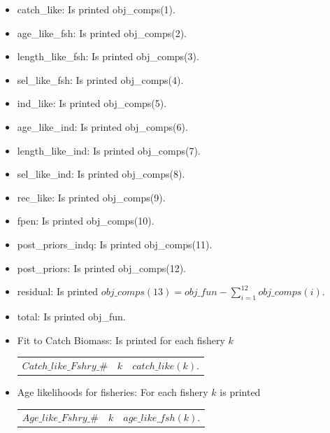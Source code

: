\documentclass{article}
\begin{document}
\begin{itemize}
    \item  catch\_like: Is printed obj\_comps(1).
    \item age\_like\_fsh: Is printed obj\_comps(2).
    \item length\_like\_fsh: Is printed obj\_comps(3).
    \item sel\_like\_fsh: Is printed obj\_comps(4).
    \item ind\_like: Is printed obj\_comps(5).
    \item age\_like\_ind: Is printed obj\_comps(6).
    \item length\_like\_ind: Is printed obj\_comps(7).
    \item sel\_like\_ind: Is printed obj\_comps(8).
    \item rec\_like: Is printed obj\_comps(9).
    \item fpen: Is printed obj\_comps(10).
    \item post\_priors\_indq: Is printed obj\_comps(11).
    \item post\_priors: Is printed obj\_comps(12).
    \item residual: Is printed $obj\_comps(13)= obj\_fun - \displaystyle\sum_{i=1}^{12}obj\_comps(i)$.
    \item total: Is printed obj\_fun.
    \item Fit to Catch Biomass: Is printed for each fishery $k$ 
    \begin{center}
        \begin{tabular}{c c c}
            $Catch\_like\_Fshry\_\#$ &  $k$ & $catch\_like(k)$.\\
        \end{tabular}
    \end{center}
    \item Age likelihoods for fisheries: For each fishery $k$ is printed
    \begin{center}
        \begin{tabular}{c c c}
            $Age\_like\_Fshry\_\#$ & $k$ & $age\_like\_fsh(k)$. \\
            

\end{tabular}
\end{center}
\end{itemize}
\end{document}

